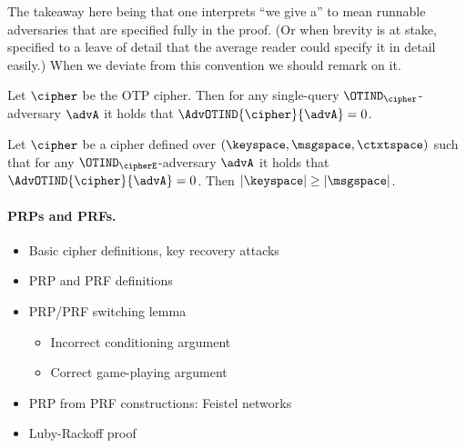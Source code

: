 The takeaway here being that one interprets ``we give a'' to mean runnable
adversaries that are specified fully in the proof. (Or when brevity is at stake,
specified to a leave of detail that the average reader could specify it in
detail easily.)  When we deviate from this convention we should remark on it.




\begin{theorem}
Let $\cipher$ be the OTP cipher. Then for any single-query
$\OTIND_\cipher$-adversary $\advA$ it holds that $\AdvOTIND{\cipher}{\advA} = 0$. \end{theorem}


\begin{theorem}
Let $\cipher$ be a cipher defined 
over $(\keyspace,\msgspace,\ctxtspace)$ such that for any $\OTIND_\cipherE$-adversary 
$\advA$ it holds that $\AdvOTIND{\cipher}{\advA} = 0$. Then $|\keyspace| \ge
|\msgspace|$. 
\end{theorem}


\begin{figure}
\end{figure}

\paragraph{PRPs and PRFs.}

\begin{itemize}
\item Basic cipher definitions, key recovery attacks
\item PRP and PRF definitions
\item PRP/PRF switching lemma
\begin{itemize}
  \item Incorrect conditioning argument 
  \item Correct game-playing argument
\end{itemize}
\item PRP from PRF constructions: Feistel networks
\item Luby-Rackoff proof
\end{itemize}


